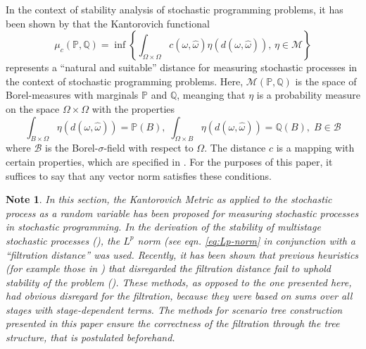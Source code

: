 \documentclass[a4paper, 12pt] {article}
\newtheorem*{Note}{Note}
\begin{document}
In the context of stability analysis of stochastic programming problems, it has been shown by \cite{Dupacova2003} that the Kantorovich functional
\begin{equation}
  \label{eq:define-infinitedim-kantorovich}
  \mu_c(\mathbb{P}, \mathbb{Q}) = \inf\left\{\int_{\Omega\times\Omega}c(\omega, \hat{\omega})\eta(d(\omega,\hat{\omega})),\, \eta\in\mathcal{M}\right\}
\end{equation}
represents a  ``natural and suitable''\cite{Dupacova2003} distance for measuring stochastic processes in the context of stochastic programming problems. 
Here, $\mathcal{M}(\mathbb{P, Q})$ is the space of Borel-measures with marginals $\mathbb{P}$ and $\mathbb{Q}$, meanging that $\eta$ is a probability measure on the space $\Omega\times\Omega$ with the properties
\begin{equation}
  \label{eq:define-borel-measures}
  \int_{B\times \Omega} \eta(d(\omega,\hat{\omega})) = \mathbb{P}(B),\;   \int_{\Omega\times B} \eta(d(\omega,\hat{\omega})) = \mathbb{Q}(B),\; B \in \mathcal{B}
\end{equation}
where $\mathcal{B}$ is the Borel-$\sigma$-field with respect to $\Omega$.
The distance $c$ is a mapping with certain properties, which are specified in \cite{Dupacova2003}.
For the purposes of this paper, it suffices to say that any vector norm satisfies these conditions.

\begin{Note}
  In this section, the Kantorovich Metric as applied to the stochastic process as a random variable has been proposed for measuring stochastic processes in stochastic programming.
  In the derivation of the stability of multistage stochastic processes (\cite{Heitsch2010}), the $L^p$ norm (see eqn. \ref{eq:Lp-norm} in conjunction with a ``filtration distance'' was used.
  Recently, it has been shown that previous heuristics (for example those in \cite{Dupacova2003}) that disregarded the filtration distance fail to uphold stability of the problem (\cite{Heitsch2009a}).
  These methods, as opposed to the one presented here, had obvious disregard for the filtration, because they were based on sums over all stages with stage-dependent terms.
  The methods for scenario tree construction presented in this paper ensure the correctness of the filtration through the tree structure, that is postulated beforehand.
\end{Note}
\end{document}
